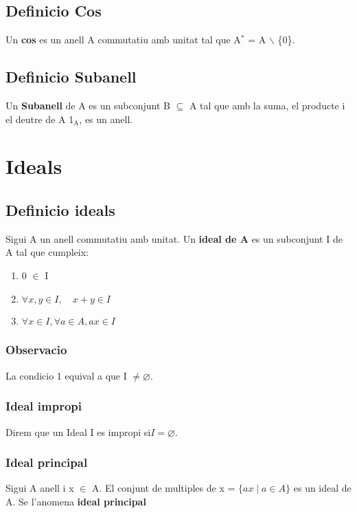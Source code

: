 \documentclass[11pt]{article}
\begin{document}
\subsection{Definicio Cos}
\label{sec:orgc69b7c1}
Un \textbf{cos} es un anell A commutatiu amb unitat tal que A\(^{\text{*}}\) = A $\backslash$ \{0\}.

\subsection{Definicio Subanell}
\label{sec:org3f2850f}
Un \textbf{Subanell} de A es un subconjunt B \(\subseteq\) A tal que amb la suma, el producte i el deutre de A 1\(_{\text{A}}\), es un anell.

\section{Ideals}
\label{sec:orgd8a8e65}

\subsection{Definicio ideals}
\label{sec:orgc07226a}
Sigui A un anell commutatiu amb unitat. Un \textbf{ideal de A} es un subconjunt I de A tal que cumpleix:
\begin{enumerate}
\item 0 \(\in\) I
\item \(\forall x, y \in I, \quad x + y \in I\)
\item \(\forall x \in I, \forall a \in A, ax \in I\)
\end{enumerate}


\subsubsection{Observacio}
\label{sec:org0ee89db}
La condicio 1 equival a que I \(\neq \varnothing\).

\subsubsection{Ideal impropi}
\label{sec:org09a4233}
Direm que un Ideal I es impropi si\(I = \varnothing\).

\subsubsection{Ideal principal}
\label{sec:org3e3c72a}
Sigui A anell i x \(\in\) A. El conjunt de multiples de x = \(\{ ax \mid a \in A \}\) es un ideal de A. Se l'anomena \textbf{ideal principal}
\end{document}
